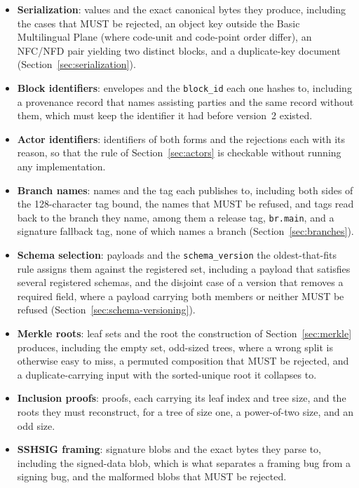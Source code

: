 \documentclass[11pt,a4paper]{article}
\begin{document}
\begin{itemize}[leftmargin=1.4em]
  \item \textbf{Serialization}: values and the exact canonical bytes they
produce, including the cases that MUST be rejected, an object key outside the
Basic Multilingual Plane (where code-unit and code-point order differ), an
NFC/NFD pair yielding two distinct blocks, and a duplicate-key document
(Section~\ref{sec:serialization}).
  \item \textbf{Block identifiers}: envelopes and the \texttt{block\_id} each
one hashes to, including a provenance record that names assisting parties and
the same record without them, which must keep the identifier it had before
version~2 existed.
  \item \textbf{Actor identifiers}: identifiers of both forms and the
rejections each with its reason, so that the rule of
Section~\ref{sec:actors} is checkable without running any implementation.
  \item \textbf{Branch names}: names and the tag each publishes to,
including both sides of the 128-character tag bound, the names that MUST be
refused, and tags read back to the branch they name, among them a release tag,
\texttt{br.main}, and a signature fallback tag, none of which names a branch
(Section~\ref{sec:branches}).
  \item \textbf{Schema selection}: payloads and the
\texttt{schema\_version} the oldest-that-fits rule assigns them against the
registered set, including a payload that satisfies several registered schemas,
and the disjoint case of a version that removes a required field, where a
payload carrying both members or neither MUST be refused
(Section~\ref{sec:schema-versioning}).
  \item \textbf{Merkle roots}: leaf sets and the root the construction of
Section~\ref{sec:merkle} produces, including the empty set, odd-sized trees,
where a wrong split is otherwise easy to miss, a permuted composition that
MUST be rejected, and a duplicate-carrying input with the sorted-unique root
it collapses to.
  \item \textbf{Inclusion proofs}: proofs, each carrying its leaf index and tree
size, and the roots they must reconstruct, for a tree of size one, a
power-of-two size, and an odd size.
  \item \textbf{SSHSIG framing}: signature blobs and the exact bytes they parse
to, including the signed-data blob, which is what separates a framing bug from a
signing bug, and the malformed blobs that MUST be rejected.

\end{itemize}
\end{document}
